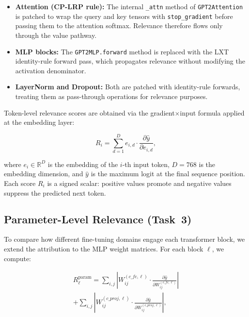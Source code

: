 \documentclass[10pt,twocolumn,letterpaper]{article}
\begin{document}
\begin{itemize}[leftmargin=*, itemsep=0pt, topsep=2pt]
  \item \textbf{Attention (CP-LRP rule):} The internal \texttt{\_attn} method
        of \texttt{GPT2Attention} is patched to wrap the query and key tensors
        with \texttt{stop\_gradient} before passing them to the attention
        softmax.
        Relevance therefore flows only through the value pathway.
  \item \textbf{MLP blocks:} The \texttt{GPT2MLP.forward} method is replaced
        with the LXT identity-rule forward pass, which propagates relevance
        without modifying the activation denominator.
  \item \textbf{LayerNorm and Dropout:} Both are patched with identity-rule
        forwards, treating them as pass-through operations for relevance
        purposes.
\end{itemize}

Token-level relevance scores are obtained via the gradient$\times$input
formula applied at the embedding layer:

\begin{equation}
  R_i = \sum_{d=1}^{D} e_{i,d} \cdot \frac{\partial \hat{y}}{\partial e_{i,d}},
  \label{eq:relevance}
\end{equation}

where $e_i \in \mathbb{R}^D$ is the embedding of the $i$-th input token,
$D = 768$ is the embedding dimension, and $\hat{y}$ is the maximum logit at
the final sequence position.
Each score $R_i$ is a signed scalar: positive values promote and negative
values suppress the predicted next token.

\subsection{Parameter-Level Relevance (Task~3)}

To compare how different fine-tuning domains engage each transformer block, we
extend the attribution to the MLP weight matrices.
For each block $\ell$, we compute:

\begin{multline}
    R_\ell^{\mathrm{param}}
      = \sum_{i,j}
        \left| W_{ij}^{(c\_fc,\ell)} \cdot
               \frac{\partial \hat{y}}{\partial W_{ij}^{(c\_fc,\ell)}} \right|
  \\
      + \sum_{i,j}
        \left| W_{ij}^{(c\_proj,\ell)} \cdot
               \frac{\partial \hat{y}}{\partial W_{ij}^{(c\_proj,\ell)}}
  \right|,
    \label{eq:param-relevance}
\end{multline}
\end{document}
